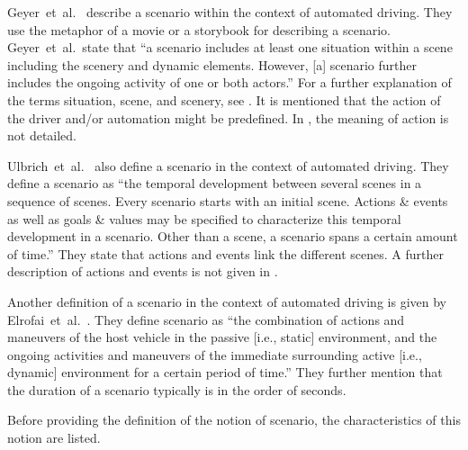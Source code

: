 Geyer~et~al.~\cite{geyer2014} describe a scenario within the context of automated driving. They use the metaphor of a movie or a storybook for describing a scenario. Geyer~et~al.\ state that ``a scenario includes at least one situation within a scene including the scenery and dynamic elements. However, [a] scenario further includes the ongoing activity of one or both actors.'' For a further explanation of the terms situation, scene, and scenery, see \cite{geyer2014}. It is mentioned that the action of the driver and/or automation might be predefined. In \cite{geyer2014}, the meaning of action is not detailed.

Ulbrich~et~al.~\cite{ulbrich2015} also define a scenario in the context of automated driving. They define a scenario as ``the temporal development between several scenes in a sequence of scenes. Every scenario starts with an initial scene. Actions \& events as well as goals \& values may be specified to characterize this temporal development in a scenario. Other than a scene, a scenario spans a certain amount of time.'' They state that actions and events link the different scenes. A further description of actions and events is not given in \cite{ulbrich2015}.

Another definition of a scenario in the context of automated driving is given by Elrofai~et~al.~\cite{elrofai2016scenario}. They define scenario as ``the combination of actions and maneuvers of the host vehicle in the passive [i.e., static] environment, and the ongoing activities and maneuvers of the immediate surrounding active [i.e., dynamic] environment for a certain period of time.'' They further mention that the duration of a scenario typically is in the order of seconds.

Before providing the definition of the notion of scenario, the characteristics of this notion are listed.


